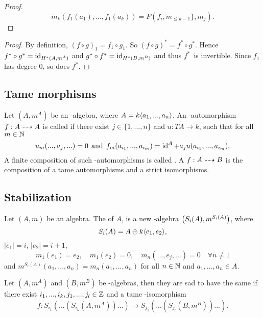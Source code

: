 \begin{proof}

\[ \tilde{m}_k (f_1(a_1),...,f_1(a_k)) = P(f_i, \tilde{m}_{\le k-1} \}, m_j).  \]

\end{proof}




\begin{proof}
By definition, $(f\circ g)_1 = f_1 \circ g_1$. So $(f \circ g)^* = f^* \circ
g^*$. Hence $f^* \circ g^* = \operatorname{id}_{H^*(A,m^A)}$ and $g^* \circ f^* =
\operatorname{id}_{H^*(B,m^B)}$ and thus $f^*$ is invertible. Since $f_1$ has degree $0$,
so does $f^*$.
\end{proof}

\subsection{Tame morphisms}
\begin{defn}
Let $(A,m^A)$ be an \Ainf-algebra, where $A = k\langle a_1,...,a_n \rangle$. An \Ainf-automorphism $f: A \dashrightarrow A$ is called
 if there exist $j \in \{1,...,n\}$ and $u: TA \to k$, such
that for all $m \in \mathbb{N}$
\[ u_m(...,a_j,...) = 0 \:\:\text{and}\:\: f_m(a_{i_1},...,a_{i_m}) = \operatorname{id}^A + a_j u(a_{i_1},...,a_{i_m}), 
\]
A finite composition of such \Ainf-automorphisms is called .
A  $f: A \dashrightarrow B$ is the composition of a tame automorphisms and a strict isomorphisms. 
\end{defn}
\subsection{Stabilization}

\begin{defn}
Let $(A,m)$ be an \Ainf algebra. The  of $A$, is a
new \Ainf-algebra $\qty(S_i(A), m^{S_i(A)})$, where
\[ S_i(A) = A \oplus k\langle e_1, e_2 \rangle, \]
$|e_1| = i$, $|e_2| = i+1$, 
\[ m_1(e_1) = e_2, \quad m_1(e_2) = 0, \quad m_n(..., e_j, ...) = 0 \quad \forall n \ne 1 \]
and $m^{S_i(A)} (a_1,...,a_n) = m_n(a_1,...,a_n)$ for all $n\in \mathbb{N}$ and $a_1,...,a_n \in A$.
\end{defn}

\begin{defn}
Let $(A,m^A)$ and $(B,m^B)$ be \Ainf-algebras, then they are sad to have the same  if there exist 
$i_1,...,i_k,j_1,...,j_l \in \mathbb{Z}$ and a tame \Ainf-isomorphism
\[ f: S_{i_1} (...(S_{i_k} (A, m^A))...) \to S_{j_1} (...(S_{j_l} (B, m^B))...). \] 
\end{defn}

